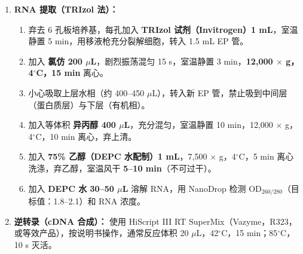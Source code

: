 \documentclass[12pt,a4paper,twoside]{article}
\begin{document}
\begin{enumerate}
  \item \textbf{RNA 提取（TRIzol 法）：}
    \begin{enumerate}
      \item 弃去 6 孔板培养基，每孔加入 \textbf{TRIzol 试剂（Invitrogen）1 mL}，室温静置 5 min，用移液枪充分裂解细胞，转入 1.5 mL EP 管。
      \item 加入 \textbf{氯仿 200 $\mu$L}，剧烈振荡混匀 15 s，室温静置 3 min，\textbf{12,000 $\times$ g，4$^{\circ}$C，15 min} 离心。
      \item 小心吸取上层水相（约 400--450 $\mu$L），转入新 EP 管，禁止吸到中间层（蛋白质层）与下层（有机相）。
      \item 加入等体积 \textbf{异丙醇 400 $\mu$L}，充分混匀，室温静置 10 min，12,000 $\times$ g，4$^{\circ}$C，10 min 离心，弃上清。
      \item 加入 \textbf{75\% 乙醇（DEPC 水配制）1 mL}，7,500 $\times$ g，4$^{\circ}$C，5 min 离心洗涤，弃乙醇，室温风干 \textbf{5--10 min}（不可过干）。
      \item 加入 \textbf{DEPC 水 30--50 $\mu$L} 溶解 RNA，用 NanoDrop 检测 OD$_{260/280}$（目标值：1.8--2.1）和 RNA 浓度。
    \end{enumerate}

  \item \textbf{逆转录（cDNA 合成）：}
    使用 HiScript III RT SuperMix（Vazyme，R323，或等效产品），按说明书操作，通常反应体积 20 $\mu$L，42$^{\circ}$C，15 min；85$^{\circ}$C，10 s 灭活。


\end{enumerate}
\end{document}
